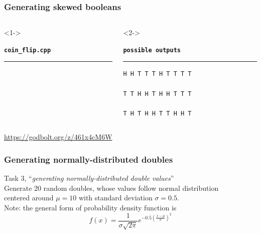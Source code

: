 \documentclass[aspectratio=169]{beamer}
\begin{document}
\begin{frame}[fragile]
\frametitle{Generating skewed booleans}
\begin{columns}[T]
  \begin{column}{0.6\textwidth}<1->
    {\color[HTML]{cb4b16}
    \texttt{\textbf{coin\_flip.cpp}}\vspace{-9pt}
    \rule{\linewidth}{2pt}}%
    {\fontsize{8}{6} }%
    \vspace{-12pt}{\color[HTML]{cb4b16}\rule{\linewidth}{2pt}}%
  \end{column}
  \begin{column}{0.3\textwidth}<2->
    {\color[HTML]{002b36}
    \texttt{\textbf{possible outputs}}\vspace{-9pt}
    \rule{\linewidth}{2pt}}%
    {\fontsize{8}{6} \begin{lstlisting}[showstringspaces=false]
H H T T T H T T T T 

T T H H T H H T T T 

T H T H H T T H H T 
    \end{lstlisting}}
    \vspace{-12pt}{\color[HTML]{002b36}\rule{\linewidth}{2pt}}%
  \end{column}
\end{columns}
\pause{}
\begin{center}\url{https://godbolt.org/z/461x4cM6W}\end{center}
\end{frame}


\begin{frame}[fragile]
\frametitle{Generating normally-distributed doubles}
  {\Large Task 3, ``\textit{generating normally-distributed double values}''}\\
  \vspace{12pt}
  Generate 20 random doubles, whose values follow normal distribution\\
  centered around $\mu{} = 10$ with standard deviation $\sigma{} = 0.5$.\\
  \vspace{24pt}
  Note: the general form of probability density function is
  $$f(x) = \frac{1}{\sigma\sqrt{2\pi}}e^{-0.5(\frac{x-\mu}{\sigma})^2}$$
\end{frame}
\end{document}
